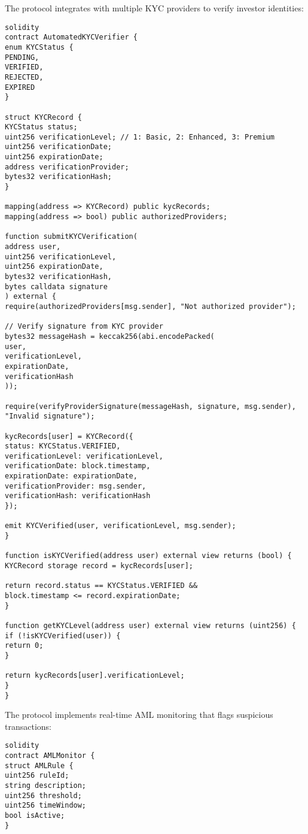 \documentclass[12pt]{article}
\begin{document}
{{{ %

The protocol integrates with multiple KYC providers to verify investor identities:


\begin{lstlisting}
solidity
contract AutomatedKYCVerifier {
enum KYCStatus {
PENDING,
VERIFIED,
REJECTED,
EXPIRED
}

struct KYCRecord {
KYCStatus status;
uint256 verificationLevel; // 1: Basic, 2: Enhanced, 3: Premium
uint256 verificationDate;
uint256 expirationDate;
address verificationProvider;
bytes32 verificationHash;
}

mapping(address => KYCRecord) public kycRecords;
mapping(address => bool) public authorizedProviders;

function submitKYCVerification(
address user,
uint256 verificationLevel,
uint256 expirationDate,
bytes32 verificationHash,
bytes calldata signature
) external {
require(authorizedProviders[msg.sender], "Not authorized provider");

// Verify signature from KYC provider
bytes32 messageHash = keccak256(abi.encodePacked(
user,
verificationLevel,
expirationDate,
verificationHash
));

require(verifyProviderSignature(messageHash, signature, msg.sender), "Invalid signature");

kycRecords[user] = KYCRecord({
status: KYCStatus.VERIFIED,
verificationLevel: verificationLevel,
verificationDate: block.timestamp,
expirationDate: expirationDate,
verificationProvider: msg.sender,
verificationHash: verificationHash
});

emit KYCVerified(user, verificationLevel, msg.sender);
}

function isKYCVerified(address user) external view returns (bool) {
KYCRecord storage record = kycRecords[user];

return record.status == KYCStatus.VERIFIED &&
block.timestamp <= record.expirationDate;
}

function getKYCLevel(address user) external view returns (uint256) {
if (!isKYCVerified(user)) {
return 0;
}

return kycRecords[user].verificationLevel;
}
}
\end{lstlisting}


The protocol implements real-time AML monitoring that flags suspicious transactions:


\begin{lstlisting}
solidity
contract AMLMonitor {
struct AMLRule {
uint256 ruleId;
string description;
uint256 threshold;
uint256 timeWindow;
bool isActive;
}


\end{lstlisting}}}}
\end{document}
